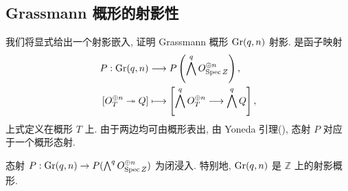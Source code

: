 \subsection{Grassmann 概形的射影性}\label{src:2.2.2-subsection}
我们将显式给出一个射影嵌入, 证明 Grassmann 概形 $\operatorname{Gr}(q,n)$ 射影.
是函子映射
\[
\begin{aligned}
P:\Gr(q,n)&\longrightarrow
\mathbb P\left(\bigwedge^q\mathcal O_{\operatorname{Spec}\mathbb Z}^{\oplus n}\right),\\
[\mathcal O_T^{\oplus n}\twoheadrightarrow Q]&\longmapsto
\left[\bigwedge^q\mathcal O_T^{\oplus n}\longrightarrow\bigwedge^qQ\right],
\end{aligned}
\]
上式定义在概形 $T$ 上. 由于两边均可由概形表出, 由 Yoneda 引理(), 态射 $P$ 对应于一个概形态射.
\begin{proposition}\label{src:2.2.8}
态射 $P:\operatorname{Gr}(q,n)\to P(\bigwedge^qO_{\operatorname{Spec}Z}^{\oplus n})$ 为闭浸入.
特别地, $\operatorname{Gr}(q,n)$ 是 $\mathbb Z$ 上的射影概形.
\end{proposition}
